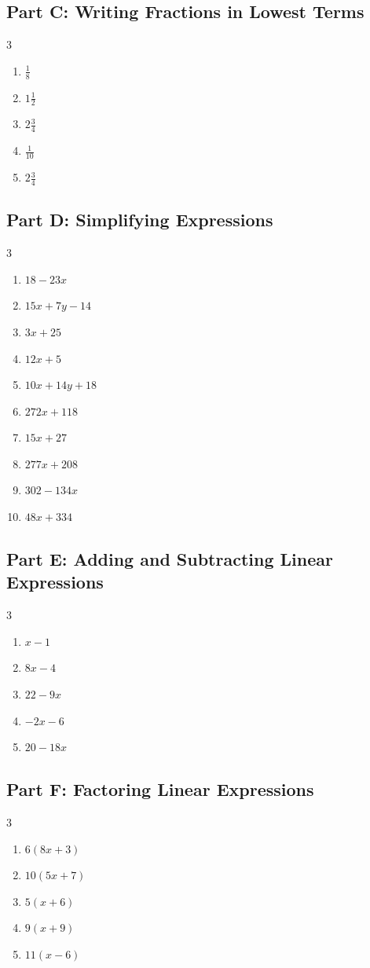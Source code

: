 \documentclass[11pt]{article}
\begin{document}
\subsection*{Part C: Writing Fractions in Lowest Terms}
\begin{multicols}{3}
\begin{enumerate}
  \item $\frac{1}{8}$
  \item $1\frac{1}{2}$
  \item $2\frac{3}{4}$
  \item $\frac{1}{10}$
  \item $2\frac{3}{4}$
\end{enumerate}
\end{multicols}
\subsection*{Part D: Simplifying Expressions}
\begin{multicols}{3}
\begin{enumerate}
  \item $18 - 23 x$
  \item $15 x + 7 y - 14$
  \item $3 x + 25$
  \item $12 x + 5$
  \item $10 x + 14 y + 18$
  \item $272 x + 118$
  \item $15 x + 27$
  \item $277 x + 208$
  \item $302 - 134 x$
  \item $48 x + 334$
\end{enumerate}
\end{multicols}
\subsection*{Part E: Adding and Subtracting Linear Expressions}
\begin{multicols}{3}
\begin{enumerate}
  \item $x - 1$
  \item $8 x - 4$
  \item $22 - 9 x$
  \item $- 2 x - 6$
  \item $20 - 18 x$
\end{enumerate}
\end{multicols}
\subsection*{Part F: Factoring Linear Expressions}
\begin{multicols}{3}
\begin{enumerate}
  \item $6(8x + 3)$
  \item $10(5x + 7)$
  \item $5(x + 6)$
  \item $9(x + 9)$
  \item $11(x - 6)$
\end{enumerate}
\end{multicols}
\end{document}
